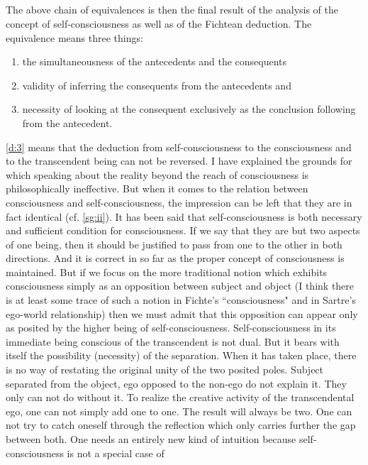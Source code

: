 \subsection{}\label{sg:iv}
The above chain of equivalences is then the final result of the analysis of the concept 
of self-consciousness as well as of
the Fichtean deduction. The equivalence means three things:
\begin{enumerate}
\item \label{d:1} the simultaneousness of the antecedents and the consequents
\item \label{d:2} validity of inferring the consequents from the antecedents and
\item \label{d:3} necessity of looking at the consequent exclusively as the conclusion following from the antecedent.
\end{enumerate}
\ref{d:3} means that the deduction from self-consciousness to the consciousness and to the transcendent being can 
not be reversed. I have explained the grounds for which speaking about the reality beyond the reach of 
consciousness is philosophically ineffective. But when it comes to the relation between consciousness and self-consciousness, the impression can be left that they are in fact identical (cf. \ref{sg:ii}). It has been said that self-consciousness is both necessary and sufficient condition for consciousness. If we say that they are but two aspects 
of one being, then it should be justified to pass from one to the other in both directions. And it is correct in so far 
as the proper concept of consciousness is maintained. But if we focus on the more traditional notion which 
exhibits consciousness simply as an opposition between subject and object (I think there is at least some trace of 
such a notion in Fichte's ``consciousness" and in Sartre's ego-world relationship) then we must admit that this 
opposition can appear only as posited by the higher being of self-consciousness. Self-consciousness in its 
immediate being conscious of the transcendent is not dual. But it bears with itself the possibility (necessity) of the 
separation. When it has taken place, there is no way of restating the original unity of the two posited poles. 
Subject separated from the object, ego opposed to the non-ego do not explain it. They only can not do without it. 
To realize the creative activity of the transcendental ego, one can not simply add one to one. The result will always be 
 two. One can not try to catch oneself through the reflection which only carries further the gap between 
both. One needs an entirely new kind of intuition because self-consciousness is not a special case of 
